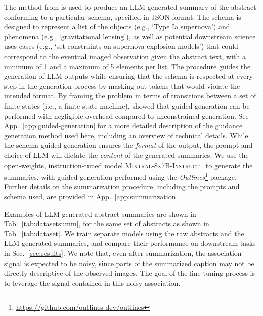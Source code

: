 \documentclass{article} %
\newcommand{\package}[1]{\textsl{#1}\xspace}
\begin{document}
   The method from \cite{willard2023efficient} is used to produce an LLM-generated summary of the abstract conforming to a particular schema, specified in JSON format.
   The schema is designed to represent a list of the objects (e.g., `Type Ia supernova') and phenomena (e.g., `gravitational lensing'), as well as potential downstream science uses cases (e.g., `set constraints on supernova explosion models') that could correspond to the eventual imaged observation given the abstract text, with a minimum of 1 and a maximum of 5 elements per list.
   The procedure guides the generation of LLM outputs while ensuring that the schema is respected at every step in the generation process by masking out tokens that would violate the intended format.
   By framing the problem in terms of transitions between a set of finite states (i.e., a finite-state machine), \cite{willard2023efficient} showed that guided generation can be performed with negligible overhead compared to unconstrained generation.
   See App.~\ref{app:guided-generation} for a more detailed description of the guidance generation method used here, including an overview of technical details.
   While the schema-guided generation ensures the \emph{format} of the output, the prompt and choice of LLM will dictate the \emph{content} of the generated summaries.
   We use the open-weights, instruction-tuned model \textsc{Mixtral-8x7B-Instruct}~\citep{jiang2024mixtral} to generate the summaries, with guided generation performed using the \package{Outlines}\footnote{\url{https://github.com/outlines-dev/outlines}} package.
   Further details on the summarization procedure, including the prompts and schema used, are provided in App.~\ref{app:summarization}.
   
   Examples of LLM-generated abstract summaries are shown in Tab.~\ref{tab:datasetsumm}, for the same set of abstracts as shown in Tab.~\ref{tab:dataset}.
   We train separate models using the raw abstracts and the LLM-generated summaries, and compare their performance on downstream tasks in Sec.~\ref{sec:results}.
   We note that, even after summarization, the association signal is expected to be noisy, since parts of the summarized caption may not be directly descriptive of the observed images. The goal of the fine-tuning process is to leverage the signal contained in this noisy association.
   
\end{document}
